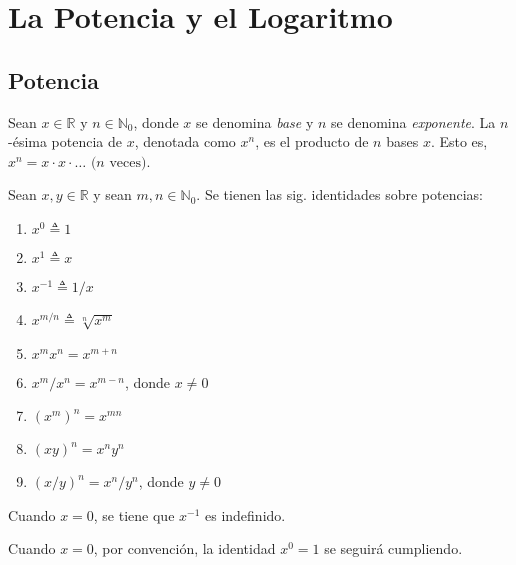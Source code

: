 
\chapter{La Potencia y el Logaritmo}

\section{Potencia}
\begin{defn}[Potencia]
Sean $x\in\mathbb{R}$ y $n\in\mathbb{N}_{0}$, donde $x$ se denomina
\emph{base} y $n$ se denomina \emph{exponente}. La $n$-ésima potencia\emph{
}de $x$, denotada como $x^{n}$, es el producto de $n$ bases $x$.
Esto es, $x^{n}=x\cdot x\cdot\dots\text{ (}n\text{ veces)}$.
\end{defn}
\begin{thm}
\label{laws-of-exp}Sean $x,y\in\mathbb{R}$ y sean $m,n\in\mathbb{N}_{0}$.
Se tienen las sig. identidades sobre potencias:
\begin{enumerate}
\item $x^{0}\triangleq1$
\item $x^{1}\triangleq x$
\item $x^{-1}\triangleq1/x$
\item $x^{m/n}\triangleq\sqrt[n]{x^{m}}$
\item $x^{m}x^{n}=x^{m+n}$
\item $x^{m}/x^{n}=x^{m-n}$, donde $x\neq0$
\item $(x^{m})^{n}=x^{mn}$
\item $(xy)^{n}=x^{n}y^{n}$
\item $(x/y)^{n}=x^{n}/y^{n}$, donde $y\neq0$
\end{enumerate}
\end{thm}
\begin{rem}
Cuando $x=0$, se tiene que $x^{-1}$ es indefinido.
\end{rem}
%
\begin{rem}
Cuando $x=0$, por convención, la identidad $x^{0}=1$ se seguirá
cumpliendo.
\end{rem}
